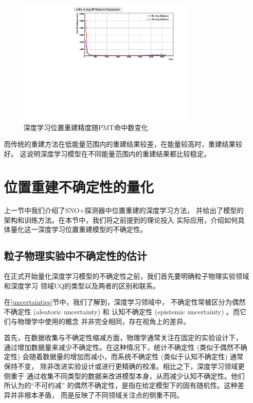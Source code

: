 \begin{figure}[htbp]
    \centering
    \includegraphics[width=0.8\textwidth]{figures/nhits_vs_dist_avg_comp.pdf}
    \caption{深度学习位置重建精度随PMT命中数变化}
    \label{fig:hit_resolution}
\end{figure}


而传统的重建方法在低能量范围内的重建结果较差，在能量较高时，重建结果较好。
这说明深度学习模型在不同能量范围内的重建结果都比较稳定。 


\section{位置重建不确定性的量化}\label{sec:uncertainty}

上一节中我们介绍了SNO+探测器中位置重建的深度学习方法，
并给出了模型的架构和训练方法。在本节中，我们将之前提到的理论投入
实际应用，介绍如何具体量化这一深度学习位置重建模型的不确定性。

\subsection{粒子物理实验中不确定性的估计}

在正式开始量化深度学习模型的不确定性之前，我们首先要明确粒子物理实验领域和深度学习
领域UQ的类型以及两者的区别和联系。\cite{ParticleDataGroup:2024cfk}


在\ref{uncertainties}节中，我们了解到，深度学习领域中，
不确定性常被区分为偶然不确定性 (aleatoric uncertainty) 和
认知不确定性 (epistemic uncertainty) 。而它们与物理学中使用的概念
并非完全相同，存在视角上的差异。

首先，在数据收集与不确定性缩减方面，物理学通常关注在固定的实验设计下，
通过增加数据量来减少不确定性。在这种情况下，统计不确定性 (类似于偶然不确定性) 
会随着数据量的增加而减小，而系统不确定性 (类似于认知不确定性) 通常保持不变，
除非改进实验设计或进行更精确的校准。相比之下，深度学习领域更侧重于
通过收集不同类型的数据来改进模型本身，从而减少认知不确定性。他们所认为的“不可约减”
的偶然不确定性，是指在给定模型下的固有随机性。这种差异并非根本矛盾，
而是反映了不同领域关注点的侧重不同。

